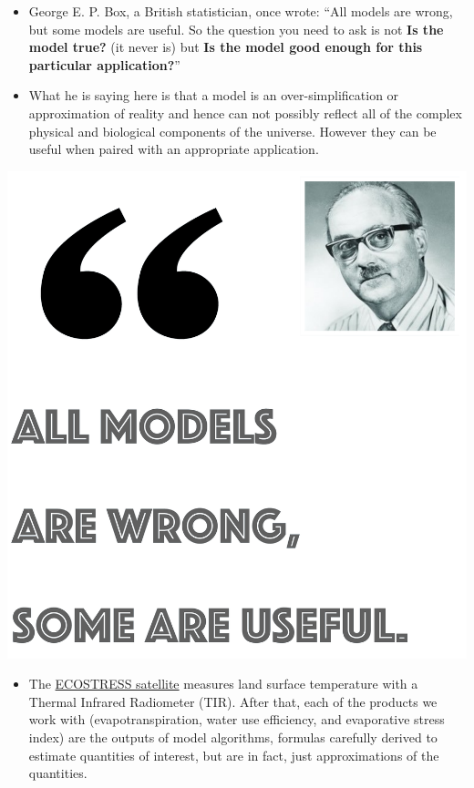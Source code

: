\documentclass[oneside,a4paper,11pt,explicit]{book}
\begin{document}
\begin{tcolorbox}[colback=yellow!5!white,colframe=IceCreamLeaf,title=\textbf{A Quick Note About Models}]
	\begin{multicols}{2}
	
	\begin{itemize}
		\item George E. P. Box, a British statistician, once wrote: ``All models are wrong, but some models are useful. So the question you need to ask is not \textbf{Is the model true?} (it never is) but \textbf{Is the model good enough for this particular application?}''
            \item What he is saying here is that a model is an over-simplification or approximation of reality and hence can not possibly reflect all of the complex physical and biological components of the universe. However they can be useful when paired with an appropriate application. 
	\end{itemize}

 
    \columnbreak
    \centerline{\includegraphics[width=\columnwidth]{BoxQuote.png}}

    \end{multicols}
    \begin{itemize}
        \item The \href{https://ecostress.jpl.nasa.gov/instrument}{ECOSTRESS satellite} measures land surface temperature with a Thermal Infrared Radiometer (TIR). After that, each of the products we work with (evapotranspiration, water use efficiency, and evaporative stress index) are the outputs of model algorithms, formulas carefully derived to estimate quantities of interest, but are in fact, just approximations of the quantities.
    \end{itemize}
\end{tcolorbox}
\end{document}
